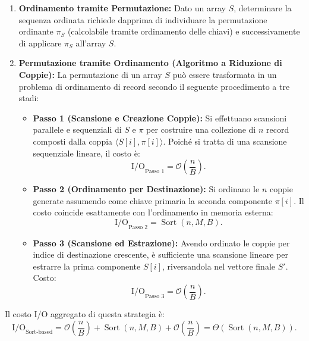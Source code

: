 \begin{enumerate}
  \item \textbf{Ordinamento tramite Permutazione:} Dato un array $S$, determinare la sequenza ordinata richiede dapprima di individuare la permutazione ordinante $\pi_S$ (calcolabile tramite ordinamento delle chiavi) e successivamente di applicare $\pi_S$ all'array $S$.
  \item \textbf{Permutazione tramite Ordinamento (Algoritmo a Riduzione di Coppie):}
  La permutazione di un array $S$ può essere trasformata in un problema di ordinamento di record secondo il seguente procedimento a tre stadi:
  \begin{itemize}
    \item \textbf{Passo 1 (Scansione e Creazione Coppie):} Si effettuano scansioni parallele e sequenziali di $S$ e $\pi$ per costruire una collezione di $n$ record composti dalla coppia $\langle S[i], \pi[i] \rangle$. Poiché si tratta di una scansione sequenziale lineare, il costo è:
    \[
      \mathrm{I/O}_{\text{Passo 1}} = \mathcal{O}\left(\frac{n}{B}\right).
    \]
    \item \textbf{Passo 2 (Ordinamento per Destinazione):} Si ordinano le $n$ coppie generate assumendo come chiave primaria la seconda componente $\pi[i]$. Il costo coincide esattamente con l'ordinamento in memoria esterna:
    \[
      \mathrm{I/O}_{\text{Passo 2}} = \operatorname{Sort}(n, M, B).
    \]
    \item \textbf{Passo 3 (Scansione ed Estrazione):} Avendo ordinato le coppie per indice di destinazione crescente, è sufficiente una scansione lineare per estrarre la prima componente $S[i]$, riversandola nel vettore finale $S'$. Costo:
    \[
      \mathrm{I/O}_{\text{Passo 3}} = \mathcal{O}\left(\frac{n}{B}\right).
    \]
  \end{itemize}
\end{enumerate}

Il costo I/O aggregato di questa strategia è:
\begin{equation}
  \mathrm{I/O}_{\text{Sort-based}} = \mathcal{O}\left(\frac{n}{B}\right) + \operatorname{Sort}(n, M, B) + \mathcal{O}\left(\frac{n}{B}\right) = \Theta(\operatorname{Sort}(n, M, B)).
\end{equation}

